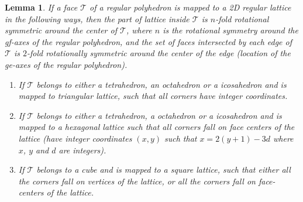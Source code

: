 \documentclass[11pt]{article}
\newtheorem{lemma}[thm]{Lemma}
\newcommand{\1}{\mathds{1}}
\begin{document}
\begin{lemma}
 \label{lemma:assemblytheory:sufficient1}
 If a face $\mathcal{T}$ of a regular polyhedron is mapped to a 2D regular lattice in the following ways, then the part of lattice inside $\mathcal{T}$ is $n$-fold rotational symmetric around the center of $\mathcal{T}$, where $n$ is the rotational symmetry around the gf-axes of the regular polyhedron, and the set of faces intersected by each edge of $\mathcal{T}$ is $2$-fold rotationally symmetric around the center of the edge (location of the ge-axes of the regular polyhedron).
 \begin{enumerate}
  \item If $\mathcal{T}$ belongs to either a tetrahedron, an octahedron or a icosahedron and is mapped to triangular lattice, such that all corners have integer coordinates.
  \item If $\mathcal{T}$ belongs to either a tetrahedron, a octahedron or a icosahedron and is mapped to a hexagonal lattice such that all corners fall on face centers of the lattice (have integer coordinates $(x,y)$ such that $x=2(y+1)-3d$ where $x$, $y$ and $d$ are integers).
  \item If $\mathcal{T}$ belongs to a cube and is mapped to a square lattice, such that either all the corners fall on vertices of the lattice, or all the corners fall on face-centers of the lattice.
 \end{enumerate}
\end{lemma}
\end{document}

